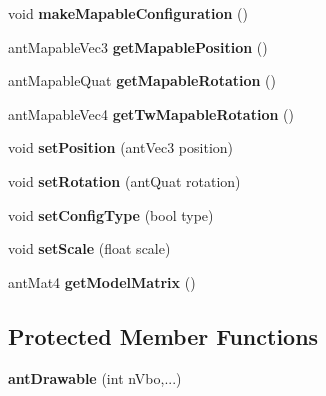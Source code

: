 \begin{DoxyCompactItemize}
\item 
\hypertarget{classant_drawable_ae9c34a770311c95a8df2c60c12a7084e}{void {\bfseries make\+Mapable\+Configuration} ()}\label{classant_drawable_ae9c34a770311c95a8df2c60c12a7084e}

\item 
\hypertarget{classant_drawable_ae6a2bd1004c7239f6cfb656a5384283b}{ant\+Mapable\+Vec3 {\bfseries get\+Mapable\+Position} ()}\label{classant_drawable_ae6a2bd1004c7239f6cfb656a5384283b}

\item 
\hypertarget{classant_drawable_aa7873338772e48eeb7d91141b4c1799a}{ant\+Mapable\+Quat {\bfseries get\+Mapable\+Rotation} ()}\label{classant_drawable_aa7873338772e48eeb7d91141b4c1799a}

\item 
\hypertarget{classant_drawable_aa142bc2d3cc5373079743990e244a246}{ant\+Mapable\+Vec4 {\bfseries get\+Tw\+Mapable\+Rotation} ()}\label{classant_drawable_aa142bc2d3cc5373079743990e244a246}

\item 
\hypertarget{classant_drawable_a1e176180c5d98f7d43863e1db51e9205}{void {\bfseries set\+Position} (ant\+Vec3 position)}\label{classant_drawable_a1e176180c5d98f7d43863e1db51e9205}

\item 
\hypertarget{classant_drawable_adfd3f1b5e87ea18fac525e08f28695e1}{void {\bfseries set\+Rotation} (ant\+Quat rotation)}\label{classant_drawable_adfd3f1b5e87ea18fac525e08f28695e1}

\item 
\hypertarget{classant_drawable_a714be84ca5ecf84989e273249d8be954}{void {\bfseries set\+Config\+Type} (bool type)}\label{classant_drawable_a714be84ca5ecf84989e273249d8be954}

\item 
\hypertarget{classant_drawable_ab666efd2bca92495cce545977cd9e2b6}{void {\bfseries set\+Scale} (float scale)}\label{classant_drawable_ab666efd2bca92495cce545977cd9e2b6}

\item 
\hypertarget{classant_drawable_a128866275b3cead6d1a7224eddf7d9b6}{ant\+Mat4 {\bfseries get\+Model\+Matrix} ()}\label{classant_drawable_a128866275b3cead6d1a7224eddf7d9b6}

\end{DoxyCompactItemize}
\subsection*{Protected Member Functions}
\begin{DoxyCompactItemize}
\item 
\hypertarget{classant_drawable_af4a5b1c438c6e057e3579479a51ec220}{{\bfseries ant\+Drawable} (int n\+Vbo,...)}\label{classant_drawable_af4a5b1c438c6e057e3579479a51ec220}

\end{DoxyCompactItemize}
